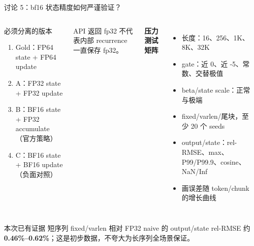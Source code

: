 \documentclass[aspectratio=169,10pt]{beamer}
\newcommand{\key}[1]{\textcolor{KdaBlue}{\textbf{#1}}}
\begin{document}
\begin{frame}{讨论 5：bf16 状态精度如何严谨验证？}
  \small
  \begin{columns}[T,onlytextwidth]
      \begin{block}{必须分离的版本}
        \begin{enumerate}
          \item Gold：FP64 state + FP64 update
          \item A：FP32 state + FP32 update
          \item B：BF16 state + FP32 accumulate（官方策略）
          \item C：BF16 state + BF16 update（负面对照）
        \end{enumerate}
      \end{block}
      \alert{API 返回 fp32 不代表内部 recurrence 一直保存 fp32。}

      \textbf{压力测试矩阵}
      \begin{itemize}
        \item 长度：16、256、1K、8K、32K
        \item gate：近 0、近 -5、常数、交替极值
        \item beta/state scale：正常与极端
        \item fixed/varlen/尾块，至少 20 个 seeds
        \item output/state：rel-RMSE、max、P99/P99.9、cosine、NaN/Inf
        \item 画误差随 token/chunk 的增长曲线
      \end{itemize}
  \end{columns}

  \vspace{0.35em}
  \begin{block}{本次已有证据}
    短序列 fixed/varlen 相对 FP32 naive 的 output/state rel-RMSE 约
    \key{0.46\%--0.62\%}；这是初步数据，不夸大为长序列全场景保证。
  \end{block}

\end{frame}
\end{document}
